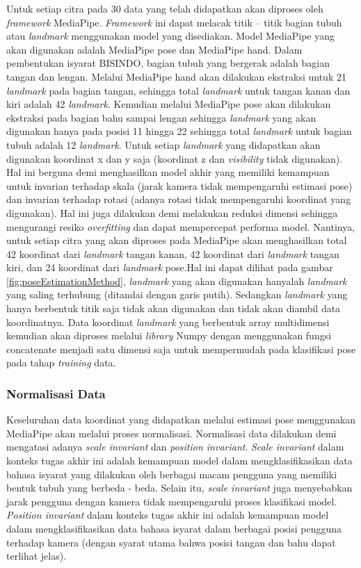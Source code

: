 Untuk setiap citra pada 30 data yang telah didapatkan akan diproses oleh \textit{framework} MediaPipe. \textit{Framework} ini dapat melacak titik – titik bagian tubuh atau \textit{landmark} menggunakan model yang disediakan. Model MediaPipe yang akan digunakan adalah MediaPipe pose dan MediaPipe hand. Dalam pembentukan isyarat BISINDO, bagian tubuh yang bergerak adalah bagian tangan dan lengan. Melalui MediaPipe hand akan dilakukan ekstraksi untuk 21 \textit{landmark} pada bagian tangan, sehingga total \textit{landmark} untuk tangan kanan dan kiri adalah 42 \textit{landmark}. Kemudian melalui MediaPipe pose akan dilakukan ekstraksi pada bagian bahu sampai lengan sehingga \textit{landmark} yang akan digunakan hanya pada posisi 11 hingga 22 sehingga total \textit{landmark} untuk bagian tubuh adalah 12 \textit{landmark}. Untuk setiap \textit{landmark} yang didapatkan akan digunakan koordinat x dan y saja (koordinat z dan \textit{visibility} tidak digunakan). Hal ini berguna demi menghasilkan model akhir yang memiliki kemampuan untuk invarian terhadap skala (jarak kamera tidak mempengaruhi estimasi pose) dan invarian terhadap rotasi (adanya rotasi tidak mempengaruhi koordinat yang digunakan). Hal ini juga dilakukan demi melakukan reduksi dimensi sehingga mengurangi resiko \textit{overfitting} dan dapat mempercepat performa model. Nantinya, untuk setiap citra yang akan diproses pada MediaPipe akan menghasilkan total 42 koordinat dari \textit{landmark} tangan kanan, 42 koordinat dari \textit{landmark} tangan kiri, dan 24 koordinat dari \textit{landmark} pose.Hal ini dapat dilihat pada gambar \ref{fig:poseEstimationMethod}, \textit{landmark} yang akan digunakan hanyalah \textit{landmark} yang saling terhubung (ditandai dengan garis putih). Sedangkan \textit{landmark} yang hanya berbentuk titik saja tidak akan digunakan dan tidak akan diambil data koordinatnya. Data koordinat \textit{landmark} yang berbentuk array multidimensi kemudian akan diproses melalui \textit{library} Numpy dengan menggunakan fungsi concatenate menjadi satu dimensi saja untuk mempermudah pada klasifikasi pose pada tahap \textit{training} data.

\subsubsection{Normalisasi Data}
Keseluruhan data koordinat yang didapatkan melalui estimasi pose menggunakan MediaPipe akan melalui proses normalisasi. Normalisasi data dilakukan demi mengatasi adanya \textit{scale invariant} dan \textit{position invariant}. \textit{Scale invariant} dalam konteks tugas akhir ini adalah kemampuan model dalam mengklasifikasikan data bahasa isyarat yang dilakukan oleh berbagai macam pengguna yang memiliki bentuk tubuh yang berbeda - beda. Selain itu, \textit{scale invariant} juga menyebabkan jarak pengguna dengan kamera tidak mempengaruhi proses klasifikasi model. \textit{Position invariant} dalam konteks tugas akhir ini adalah kemampuan model dalam mengklasifikasikan data bahasa isyarat dalam berbagai posisi pengguna terhadap kamera (dengan syarat utama bahwa posisi tangan dan bahu dapat terlihat jelas).

